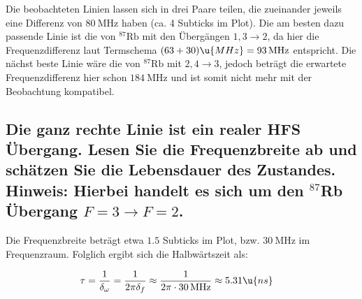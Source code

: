 \documentclass[ex,minted]{exercise_4.1}
\begin{document}
Die beobachteten Linien lassen sich in drei Paare teilen, die zueinander  jeweils eine Differenz von $\SI{80}{\mega\hertz}$ haben (ca. 4 Subticks im Plot). Die am besten dazu passende Linie ist die von \({^{87}\mathrm{Rb}}\) mit den Übergängen \(1,3\to 2\), da hier die Frequenzdifferenz laut Termschema \((63+30)\u{MHz} = \SI{93}{\mega\hertz}\) entspricht. Die nächst beste Linie wäre die von \({^{87}\mathrm{Rb}}\) mit \(2,4\to 3\), jedoch beträgt die erwartete Frequenzdifferenz hier schon \(\SI{184}{\mega\hertz}\) und ist somit nicht mehr mit der Beobachtung kompatibel.

\subsection{Die ganz rechte Linie ist ein realer HFS Übergang. Lesen Sie die Frequenzbreite ab und schätzen Sie die
Lebensdauer des Zustandes.\\
Hinweis: Hierbei handelt es sich um den ${}^{87}$Rb Übergang $F = 3 \to F = 2$.}

\dottedlinett 

Die Frequenzbreite beträgt etwa \(1.5\) Subticks im Plot, bzw. \(\SI{30}{\mega\hertz}\) im Frequenzraum. Folglich ergibt sich die Halbwärtszeit als:

\begin{align*}
    \tau &= \frac{1}{\delta_\omega}
    = \frac{1}{2\pi\delta_f}
    \approx \frac{1}{2\pi\cdot \SI{30}{\mega\hertz}} \approx 5.31\u{ns}
\end{align*}
\end{document}
